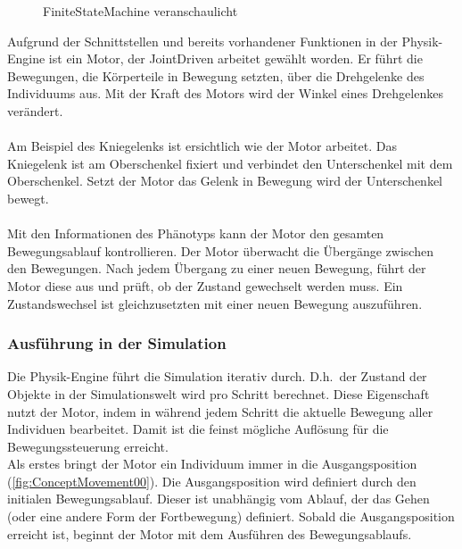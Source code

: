       \begin{figure}[H]
        \centering
        
        \caption{\Gls{FiniteStateMachine} veranschaulicht\label{fig:ConceptEngineFSM}}
      \end{figure}

      Aufgrund der Schnittstellen und bereits vorhandener Funktionen in der Physik-Engine ist ein Motor,
      der \gls{JointDriven} arbeitet gewählt worden.
      Er führt die Bewegungen, die Körperteile in Bewegung setzten, über die Drehgelenke des Individuums aus.
      Mit der Kraft des Motors wird der Winkel eines Drehgelenkes verändert.
      \\
      \\
      Am Beispiel des Kniegelenks ist ersichtlich wie der Motor arbeitet.
      Das Kniegelenk ist am Oberschenkel fixiert und verbindet den Unterschenkel mit dem Oberschenkel.
      Setzt der Motor das Gelenk in Bewegung wird der Unterschenkel bewegt.
      \\
      \\
      Mit den Informationen des Phänotyps kann der Motor den gesamten Bewegungsablauf kontrollieren.
      Der Motor überwacht die Übergänge zwischen den Bewegungen.
      Nach jedem Übergang zu einer neuen Bewegung, führt der Motor diese aus und prüft,
      ob der Zustand gewechselt werden muss.
      Ein Zustandswechsel ist gleichzusetzten mit einer neuen Bewegung auszuführen.

      \subsubsection{Ausführung in der Simulation}

      Die Physik-Engine führt die Simulation iterativ durch.
      D.h.\ der Zustand der Objekte in der Simulationswelt wird pro Schritt berechnet.
      Diese Eigenschaft nutzt der Motor,
      indem in während jedem Schritt die aktuelle Bewegung aller Individuen bearbeitet.
      Damit ist die feinst mögliche Auflösung für die Bewegungssteuerung erreicht.
      \\
      Als erstes bringt der Motor ein Individuum immer in die Ausgangsposition (\vref{fig:ConceptMovement00}).
      Die Ausgangsposition wird definiert durch den initialen Bewegungsablauf.
      Dieser ist unabhängig vom Ablauf, der das Gehen (oder eine andere Form der Fortbewegung) definiert.
      Sobald die Ausgangsposition erreicht ist, beginnt der Motor mit dem Ausführen des Bewegungsablaufs.

